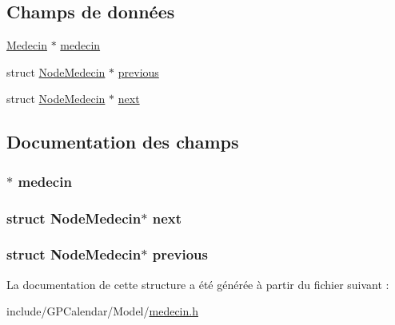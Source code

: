 \subsection*{Champs de données}
\begin{DoxyCompactItemize}
\item 
\hyperlink{struct_medecin}{Medecin} $\ast$ \hyperlink{struct_node_medecin_a59131973441fcf6250df021bcf96d17c}{medecin}
\item 
struct \hyperlink{struct_node_medecin}{Node\-Medecin} $\ast$ \hyperlink{struct_node_medecin_a0cbe061047b7421412bf7e7dfc5b14f6}{previous}
\item 
struct \hyperlink{struct_node_medecin}{Node\-Medecin} $\ast$ \hyperlink{struct_node_medecin_a2bccf75b1d4b377994dcbb49ebdb9207}{next}
\end{DoxyCompactItemize}


\subsection{Documentation des champs}
\hypertarget{struct_node_medecin_a59131973441fcf6250df021bcf96d17c}{
\subsubsection[{medecin}]{$\ast$ medecin}}\label{struct_node_medecin_a59131973441fcf6250df021bcf96d17c}
\hypertarget{struct_node_medecin_a2bccf75b1d4b377994dcbb49ebdb9207}{
\subsubsection[{next}]{\setlength{\rightskip}{0pt plus 5cm}struct {\bf Node\-Medecin}$\ast$ next}}\label{struct_node_medecin_a2bccf75b1d4b377994dcbb49ebdb9207}
\hypertarget{struct_node_medecin_a0cbe061047b7421412bf7e7dfc5b14f6}{
\subsubsection[{previous}]{\setlength{\rightskip}{0pt plus 5cm}struct {\bf Node\-Medecin}$\ast$ previous}}\label{struct_node_medecin_a0cbe061047b7421412bf7e7dfc5b14f6}


La documentation de cette structure a été générée à partir du fichier suivant \-:\begin{DoxyCompactItemize}
\item 
include/\-G\-P\-Calendar/\-Model/\hyperlink{medecin_8h}{medecin.\-h}\end{DoxyCompactItemize}
